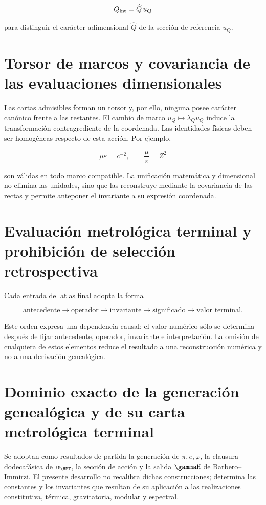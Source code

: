 \[
Q_{\rm int}=\widehat Q\,u_Q
\]

para distinguir el car\'acter adimensional \(\widehat Q\) de la secci\'on
de referencia \(u_Q\).

\section{Torsor de marcos y covariancia de las evaluaciones dimensionales}

Las cartas admisibles forman un torsor y, por ello, ninguna posee car\'acter
can\'onico frente a las restantes. El cambio de marco
\(u_Q\mapsto\lambda_Q u_Q\) induce la transformaci\'on contragrediente
de la coordenada. Las identidades f\'isicas deben ser homog\'eneas respecto
de esta acci\'on. Por ejemplo,

\[
\mu\varepsilon=c^{-2},\qquad \frac\mu\varepsilon=Z^2
\]

son v\'alidas en todo marco compatible. La unificaci\'on matem\'atica y
dimensional no elimina las unidades, sino que las reconstruye mediante la
covariancia de las rectas y permite anteponer el invariante a su expresi\'on
coordenada.

\section{Evaluación metrológica terminal y prohibición de selección retrospectiva}

Cada entrada del atlas final adopta la forma

\begin{equation}
\boxed{\text{antecedente}\to\text{operador}\to\text{invariante}
\to\text{significado}\to\text{valor terminal}.}
\label{p3-83-c23-s1:eq:atlas-rule}
\end{equation}

Este orden expresa una dependencia causal: el valor num\'erico s\'olo se
determina despu\'es de fijar antecedente, operador, invariante e
interpretaci\'on. La omisi\'on de cualquiera de estos elementos reduce el
resultado a una reconstrucci\'on num\'erica y no a una derivaci\'on
geneal\'ogica.

\section{Dominio exacto de la generación genealógica y de su carta metrológica terminal}

Se adoptan como resultados de partida la generaci\'on de
\(\pi,e,\varphi\), la clausura dodecaf\'asica de \(\alpha_{\HMT}\),
la secci\'on de acci\'on y la salida \(\gammaH\) de Barbero--Immirzi. El
presente desarrollo no recalibra dichas construcciones; determina las constantes
y los invariantes que resultan de su aplicaci\'on a las realizaciones
constitutiva, t\'ermica, gravitatoria, modular y espectral.

